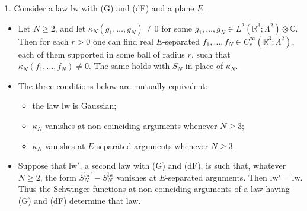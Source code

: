 \documentclass[11pt]{amsart}
\newcommand{\namedhead}{}
\theoremstyle{definition}
\newtheorem*{namedinner}{\namedhead}
\newenvironment{named}[1]{\renewcommand{\namedhead}{#1}\begin{namedinner}}{\end{namedinner}}
\begin{document}
\begin{named}{Proposition 1.2}
Consider a law $\mathrm{lw}$ with (G) and (dF) and a plane $E$.
\begin{itemize}
\item[(a)] Let $N\ge2$, and let $\kappa_N(g_1,\dots,g_N)\neq0$ for some $g_1,\dots,g_N\in L^2(\mathbb{R}^3;\Lambda^2)\otimes\mathbb{C}$.
Then for each $r>0$ one can find real $E$-separated $f_1,\dots,f_N\in C_c^\infty(\mathbb{R}^3;\Lambda^2)$, each of them supported in some ball of radius $r$, such that $\kappa_N(f_1,\dots,f_N)\neq0$.
The same holds with $S_N$ in place of $\kappa_N$.
\item[(b)] The three conditions below are mutually equivalent:
\begin{itemize}
\item[(i)] the law $\mathrm{lw}$ is Gaussian;
\item[(ii)] $\kappa_N$ vanishes at non-coinciding arguments whenever $N\ge3$;
\item[(iii)] $\kappa_N$ vanishes at $E$-separated arguments whenever $N\ge3$.
\end{itemize}
\item[(c)] Suppose that $\mathrm{lw}'$, a second law with (G) and (dF), is such that, whatever $N\ge2$, the form $S_N^{\mathrm{lw}'}-S_N^{\mathrm{lw}}$ vanishes at $E$-separated arguments.
Then $\mathrm{lw}'=\mathrm{lw}$.
Thus the Schwinger functions at non-coinciding arguments of a law having (G) and (dF) determine that law.
\end{itemize}
\end{named}
\end{document}
